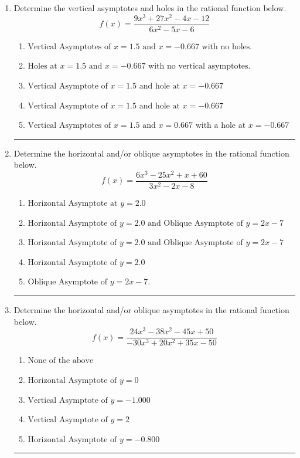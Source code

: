\documentclass[14pt]{extbook}
\newcommand{\litem}[1]{\item#1\hspace*{-1cm}\rule{\textwidth}{0.4pt}}
\begin{document}
\begin{enumerate}
{\begin{enumerate}[label=\Alph*.]
\end{enumerate} }
\litem{
Determine the vertical asymptotes and holes in the rational function below.\[ f(x) = \frac{9x^{3} +27 x^{2} -4 x -12}{6x^{2} -5 x -6} \]\begin{enumerate}[label=\Alph*.]
\item \( \text{Vertical Asymptotes of } x = 1.5 \text{ and } x = -0.667 \text{ with no holes.} \)
\item \( \text{Holes at } x = 1.5 \text{ and } x = -0.667 \text{ with no vertical asymptotes.} \)
\item \( \text{Vertical Asymptote of } x = 1.5 \text{ and hole at } x = -0.667 \)
\item \( \text{Vertical Asymptote of } x = 1.5 \text{ and hole at } x = -0.667 \)
\item \( \text{Vertical Asymptotes of } x = 1.5 \text{ and } x = 0.667 \text{ with a hole at } x = -0.667 \)

\end{enumerate} }
\litem{
Determine the horizontal and/or oblique asymptotes in the rational function below.\[ f(x) = \frac{6x^{3} -25 x^{2} +x + 60}{3x^{2} -2 x -8} \]\begin{enumerate}[label=\Alph*.]
\item \( \text{Horizontal Asymptote at } y = 2.0 \)
\item \( \text{Horizontal Asymptote of } y = 2.0 \text{ and Oblique Asymptote of } y = 2x -7 \)
\item \( \text{Horizontal Asymptote of } y = 2.0 \text{ and Oblique Asymptote of } y = 2x -7 \)
\item \( \text{Horizontal Asymptote of } y = 2.0  \)
\item \( \text{Oblique Asymptote of } y = 2x -7. \)

\end{enumerate} }
\litem{
Determine the horizontal and/or oblique asymptotes in the rational function below.\[ f(x) = \frac{24x^{3} -38 x^{2} -45 x + 50}{-30x^{3} +20 x^{2} +35 x -50} \]\begin{enumerate}[label=\Alph*.]
\item \( \text{None of the above} \)
\item \( \text{Horizontal Asymptote of } y = 0  \)
\item \( \text{Vertical Asymptote of } y = -1.000  \)
\item \( \text{Vertical Asymptote of } y = 2  \)
\item \( \text{Horizontal Asymptote of } y = -0.800  \)


\end{enumerate}}
\end{enumerate}
\end{document}
